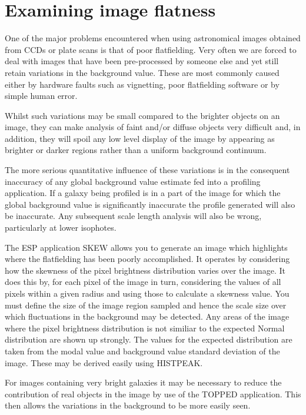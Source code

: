 \documentclass[twoside,11pt]{article}
\begin{document}
\section{Examining image flatness}
\label{sec:examining}

One of the major problems encountered when using astronomical images
obtained from CCDs or plate scans is that of poor flatfielding. Very often
we are forced to deal with images that have been pre-processed by
someone else and yet still retain variations in the background value.
These are most commonly caused either by hardware faults such as vignetting,
poor flatfielding software or by simple human error.

Whilst such variations may be small compared to the brighter
objects on an image, they can make analysis of faint and/or diffuse objects
very difficult and, in addition, they will spoil any low level display of the
image by appearing as brighter or darker regions rather than a uniform
background continuum.

The more serious quantitative influence of these variations is in
the consequent inaccuracy of any global background value estimate fed into a
profiling application. If a galaxy being profiled is in a part of the image for
which the global background value is significantly inaccurate the profile
generated will also be inaccurate. Any subsequent scale length analysis
will also be wrong, particularly at lower isophotes.

The ESP application SKEW allows you to generate an image which highlights
where the flatfielding has been poorly accomplished.
It operates by considering how the skewness of the pixel brightness distribution
varies over the image. It does this by, for each pixel of the image in turn,
considering the values of all pixels within a given radius and using those to
calculate a skewness value. You must define the size of the image region
sampled and hence the scale size over which fluctuations in the background
may be detected. Any areas of the image where the pixel brightness distribution
is not similiar to the expected Normal distribution are shown up strongly.
The values for the expected distribution are taken from the modal value
and background value standard deviation of the image. These may be derived easily
using HISTPEAK.

For images containing very bright galaxies it may be necessary to reduce the
contribution of real objects in the image by use of the TOPPED application.
This then allows the variations in the background to be
more easily seen.
\end{document}

